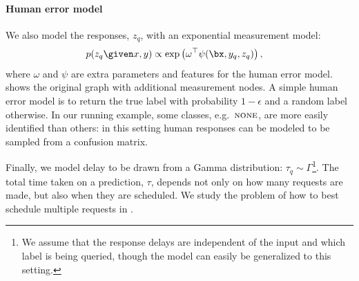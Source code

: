 
\paragraph{Human error model}
We also model the responses, $z_q$, with an exponential measurement model:
\begin{align*}
  p(z_q \given x, y) 
  &\propto \exp \left( \omega^\top\psi(\bx, y_q, z_q) \right),
\end{align*}
where $\omega$ and $\psi$ are extra parameters and features for the human error model. 
 shows the original graph with additional measurement nodes.
A simple human error model is to return the true label with probability $1-\epsilon$ and a random label otherwise.
In our running example, some classes, e.g.\ $\textsc{none}$, are more easily identified than others: in this setting human responses can be modeled to be sampled from a confusion matrix.

Finally, we model delay to be drawn from a Gamma distribution: $\tau_q \sim \Gamma$\footnote{We assume that the response delays are independent of the input and which label is being queried, though the model can easily be generalized to this setting.}.
The total time taken on a prediction, $\tau$, depends not only on how many requests are made, but also when they are scheduled.
We study the problem of how to best schedule multiple requests in .



